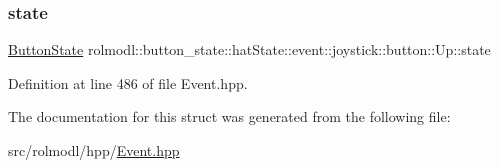 \subsubsection{\texorpdfstring{state}{state}}
{\footnotesize\ttfamily \mbox{\hyperlink{namespacerolmodl_ad08ec5c56aa1db118f871357b2d475fd}{Button\+State}} rolmodl\+::button\+\_\+state\+::hat\+State\+::event\+::joystick\+::button\+::\+Up\+::state}



Definition at line 486 of file Event.\+hpp.



The documentation for this struct was generated from the following file\+:\begin{DoxyCompactItemize}
\item 
src/rolmodl/hpp/\mbox{\hyperlink{_event_8hpp}{Event.\+hpp}}\end{DoxyCompactItemize}
